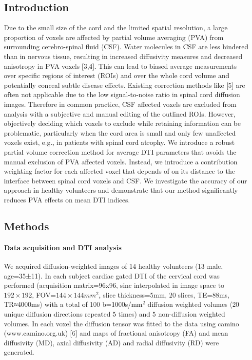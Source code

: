 \subsection*{Introduction} Due to the small size of the cord and the limited spatial resolution, a large proportion of voxels are affected by partial volume averaging (PVA) from surrounding cerebro-spinal fluid (CSF). Water molecules in CSF are less hindered than in nervous tissue, resulting in increased diffusivity measures and decreased anisotropy in PVA voxels [3,4]. This can lead to biased average measurements over specific regions of interest (ROIs) and over the whole cord volume and potentially conceal subtle disease effects. Existing correction methods like [5] are often not applicable due to the low signal-to-noise ratio in spinal cord diffusion images. Therefore in common practice, CSF affected voxels are excluded from analysis with a subjective and manual editing of the outlined ROIs. However, objectively deciding which voxels to exclude while retaining information can be problematic, particularly when the cord area is small and only few unaffected voxels exist, e.g., in patients with spinal cord atrophy. We introduce a robust partial volume correction method for average DTI parameters that avoids the manual exclusion of PVA affected voxels. Instead, we introduce a contribution weighting factor for each affected voxel that depends of on its distance to the interface between spinal cord voxels and CSF. We investigate the accuracy of our approach in healthy volunteers and demonstrate that our method significantly reduces PVA effects on mean DTI indices. 
\subsection*{Methods} 
\paragraph{Data acquisition and DTI analysis} We acquired diffusion-weighted images of 14 healthy volunteers (13 male, age=35±11). In each subject cardiac gated DTI of the cervical cord was performed (acquisition matrix=96x96, sinc interpolated in image space to $192\times 192$, FOV=$144\times 144mm^2$, slice thickness=5mm, 20 slices, TE=88ms, TR≈4000ms) with a total of 100 b=1000s/mm$^2$ diffusion weighted volumes (20 unique diffusion directions repeated 5 times) and 5 non-diffusion weighted volumes. In each voxel the diffusion tensor was fitted to the data using camino (www.camino.org.uk) [6] and maps of fractional anisotropy (FA) and mean diffusivity (MD), axial diffusivity (AD) and radial diffusivity (RD) were generated. 
